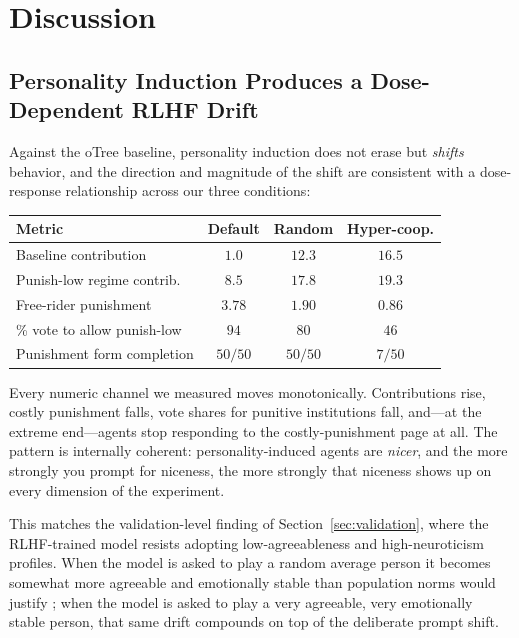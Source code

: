 \documentclass[12pt, a4paper]{article}
\begin{document}
\section{Discussion}
\label{sec:discussion}

\subsection{Personality Induction Produces a Dose-Dependent RLHF Drift}

Against the oTree baseline, personality induction does not erase but \emph{shifts} behavior, and the direction and magnitude of the shift are consistent with a dose-response relationship across our three conditions:

\begin{center}
\begin{tabular}{lccc}
\toprule
Metric & Default & Random & Hyper-coop. \\
\midrule
Baseline contribution      & $1.0$  & $12.3$ & $16.5$ \\
Punish-low regime contrib. & $8.5$  & $17.8$ & $19.3$ \\
Free-rider punishment      & $3.78$ & $1.90$ & $0.86$ \\
\% vote to allow punish-low & $94$   & $80$   & $46$   \\
Punishment form completion  & $50/50$& $50/50$& $7/50$ \\
\bottomrule
\end{tabular}
\end{center}

Every numeric channel we measured moves monotonically. Contributions rise, costly punishment falls, vote shares for punitive institutions fall, and---at the extreme end---agents stop responding to the costly-punishment page at all. The pattern is internally coherent: personality-induced agents are \emph{nicer}, and the more strongly you prompt for niceness, the more strongly that niceness shows up on every dimension of the experiment.

This matches the validation-level finding of Section~\ref{sec:validation}, where the RLHF-trained model resists adopting low-agreeableness and high-neuroticism profiles. When the model is asked to play a random average person it becomes somewhat more agreeable and emotionally stable than population norms would justify \citep{salecha2024social, serapio2023personality}; when the model is asked to play a very agreeable, very emotionally stable person, that same drift compounds on top of the deliberate prompt shift.
\end{document}
